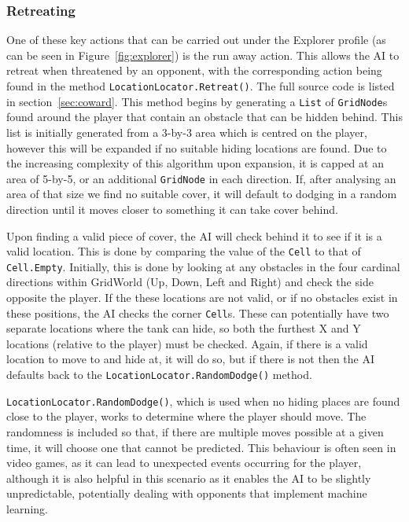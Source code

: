 \documentclass[11pt]{article}
\begin{document}
\subsubsection{Retreating}

One of these key actions that can be carried out under the Explorer profile (as can be seen in Figure~\ref{fig:explorer}) is the run away action. This allows the AI to retreat when threatened by an opponent, with the corresponding action being found in the method \verb|LocationLocator.Retreat()|. The full source code is listed in section~\ref{sec:coward}. This method begins by generating a \verb|List| of \verb|GridNode|s found around the player that contain an obstacle that can be hidden behind. This list is initially generated from a 3-by-3 area which is centred on the player, however this will be expanded if no suitable hiding locations are found. Due to the increasing complexity of this algorithm upon expansion\cite{GeorgeComplex}, it is capped at an area of 5-by-5, or an additional \verb|GridNode| in each direction. If, after analysing an area of that size we find no suitable cover, it will default to dodging in a random direction until it moves closer to something it can take cover behind.

Upon finding a valid piece of cover, the AI will check behind it to see if it is a valid location. This is done by comparing the value of the \verb|Cell| to that of \verb|Cell.Empty|. Initially, this is done by looking at any obstacles in the four cardinal directions within GridWorld (Up, Down, Left and Right) and check the side opposite the player. If the these locations are not valid, or if no obstacles exist in these positions, the AI checks the corner \verb|Cell|s. These can potentially have two separate locations where the tank can hide, so both the furthest X and Y locations (relative to the player) must be checked. Again, if there is a valid location to move to and hide at, it will do so, but if there is not then the AI defaults back to the \verb|LocationLocator.RandomDodge()| method.

\verb|LocationLocator.RandomDodge()|, which is used when no hiding places are found close to the player, works to determine where the player should move. The randomness is included so that, if there are multiple moves possible at a given time, it will choose one that cannot be predicted. This behaviour is often seen in video games\cite{GeorgeRandom}, as it can lead to unexpected events occurring for the player, although it is also helpful in this scenario as it enables the AI to be slightly unpredictable, potentially dealing with opponents that implement machine learning.
\end{document}
